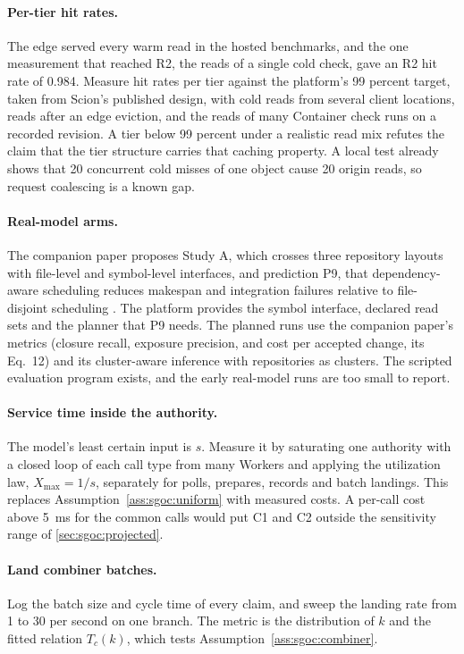 \documentclass[11pt,letterpaper]{article}
\theoremstyle{definition}
\theoremstyle{remark}
\begin{document}
\paragraph{Per-tier hit rates.} The edge served every warm read in the hosted benchmarks, and the one measurement that reached R2, the reads of a single cold check, gave an R2 hit rate of 0.984. %
Measure hit rates per tier against the platform's 99 percent target, taken from Scion's published design, with cold reads from several client locations, reads after an edge eviction, and the reads of many Container check runs on a recorded revision. A tier below 99 percent under a realistic read mix refutes the claim that the tier structure carries that caching property. A local test already shows that 20 concurrent cold misses of one object cause 20 origin reads, so request coalescing is a known gap. %

\paragraph{Real-model arms.} The companion paper proposes Study A, which crosses three repository layouts with file-level and symbol-level interfaces, and prediction P9, that dependency-aware scheduling reduces makespan and integration failures relative to file-disjoint scheduling \cite{long2026inversion}. The platform provides the symbol interface, declared read sets and the planner that P9 needs. The planned runs use the companion paper's metrics (closure recall, exposure precision, and cost per accepted change, its Eq.~12) and its cluster-aware inference with repositories as clusters. The scripted evaluation program exists, and the early real-model runs are too small to report.

\paragraph{Service time inside the authority.} The model's least certain input is $s$. Measure it by saturating one authority with a closed loop of each call type from many Workers and applying the utilization law, $X_{\max} = 1/s$, separately for polls, prepares, records and batch landings. This replaces Assumption~\ref{ass:sgoc:uniform} with measured costs. A per-call cost above 5~ms for the common calls would put C1 and C2 outside the sensitivity range of \cref{sec:sgoc:projected}.

\paragraph{Land combiner batches.} Log the batch size and cycle time of every claim, and sweep the landing rate from 1 to 30 per second on one branch. The metric is the distribution of $k$ and the fitted relation $T_c(k)$, which tests Assumption~\ref{ass:sgoc:combiner}.
\end{document}
